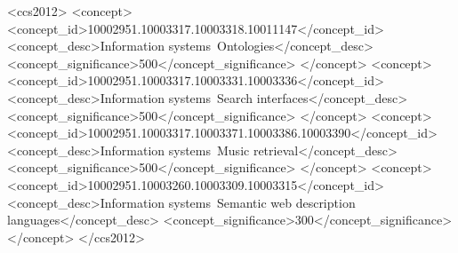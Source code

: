 \documentclass[sigconf]{acmart}
\begin{document}
%
%
\begin{CCSXML}
<ccs2012>
<concept>
<concept_id>10002951.10003317.10003318.10011147</concept_id>
<concept_desc>Information systems~Ontologies</concept_desc>
<concept_significance>500</concept_significance>
</concept>
<concept>
<concept_id>10002951.10003317.10003331.10003336</concept_id>
<concept_desc>Information systems~Search interfaces</concept_desc>
<concept_significance>500</concept_significance>
</concept>
<concept>
<concept_id>10002951.10003317.10003371.10003386.10003390</concept_id>
<concept_desc>Information systems~Music retrieval</concept_desc>
<concept_significance>500</concept_significance>
</concept>
<concept>
<concept_id>10002951.10003260.10003309.10003315</concept_id>
<concept_desc>Information systems~Semantic web description languages</concept_desc>
<concept_significance>300</concept_significance>
</concept>
</ccs2012>
\end{CCSXML}




\maketitle

\setdefaultleftmargin{0.5cm}{1.5cm}{}{}{}{}




 
\end{document}
